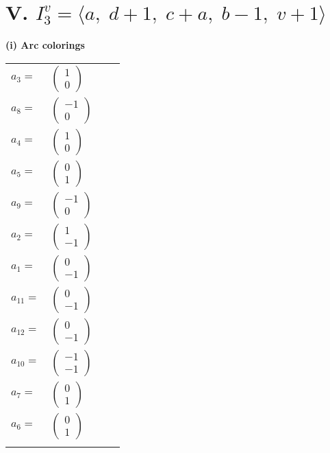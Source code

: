 \documentclass[1p]{elsarticle_modified}
\theoremstyle{definition}
\begin{document}
\centering \section*{V. $I^v_{3}= \langle a,\;d+1,\;c+a,\;b-1,\;v+1 \rangle$}
\flushleft \textbf{(i) Arc colorings}\\
\begin{tabular}{m{7pt} m{180pt} m{7pt} m{180pt} }
\flushright $a_{3}=$&$\begin{pmatrix}1\\0\end{pmatrix}$ \\
\flushright $a_{8}=$&$\begin{pmatrix}-1\\0\end{pmatrix}$ \\
\flushright $a_{4}=$&$\begin{pmatrix}1\\0\end{pmatrix}$ \\
\flushright $a_{5}=$&$\begin{pmatrix}0\\1\end{pmatrix}$ \\
\flushright $a_{9}=$&$\begin{pmatrix}-1\\0\end{pmatrix}$ \\
\flushright $a_{2}=$&$\begin{pmatrix}1\\-1\end{pmatrix}$ \\
\flushright $a_{1}=$&$\begin{pmatrix}0\\-1\end{pmatrix}$ \\
\flushright $a_{11}=$&$\begin{pmatrix}0\\-1\end{pmatrix}$ \\
\flushright $a_{12}=$&$\begin{pmatrix}0\\-1\end{pmatrix}$ \\
\flushright $a_{10}=$&$\begin{pmatrix}-1\\-1\end{pmatrix}$ \\
\flushright $a_{7}=$&$\begin{pmatrix}0\\1\end{pmatrix}$ \\
\flushright $a_{6}=$&$\begin{pmatrix}0\\1\end{pmatrix}$\\&\end{tabular}
\end{document}
